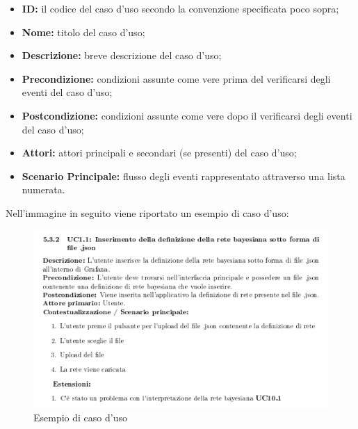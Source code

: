 \documentclass{article}
\begin{document}
    \begin{itemize}
    	\item \textbf{ID:} il codice del caso d'uso secondo la convenzione specificata poco sopra;
    	\item \textbf{Nome:} titolo del caso d'uso;
    	\item \textbf{Descrizione:} breve descrizione del caso d'uso;
    	\item \textbf{Precondizione:} condizioni assunte come vere prima del verificarsi degli eventi del caso d'uso;
    	\item \textbf{Postcondizione:} condizioni assunte come vere dopo il verificarsi degli eventi del caso d'uso;
    	\item \textbf{Attori:} attori principali e secondari (se presenti) del caso d'uso;
    	\item \textbf{Scenario Principale:} flusso degli eventi rappresentato attraverso una lista numerata.\newline
    \end{itemize}
    Nell'immagine in seguito viene riportato un esempio di caso d'uso:\newline \newline
    
    \begin{figure}[hbt!]
    	\centering
    	\includegraphics{casoduso.png}
    	\caption{Esempio di caso d'uso}
    \end{figure}
    
\end{document}
